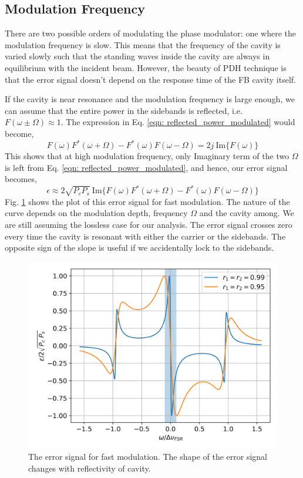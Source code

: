 \documentclass{Resources/cquicc}
\begin{document}
\subsection{Modulation Frequency}
There are two possible orders of modulating the phase modulator: one where the modulation frequency is slow. This means that the frequency of the cavity is varied slowly such that the standing waves inside the cavity are always in equilibrium with the incident beam. However, the beauty of PDH technique is that the error signal doesn't depend on the response time of the FB cavity itself. \par
If the cavity is near resonance and the modulation frequency is large enough, we can assume that the entire power in the sidebands is reflected, i.e. $F(\omega \pm \Omega) \approx 1$. The expression in Eq. \ref{eqn: reflected_power_modulated} would become, 
\begin{equation}
  F(\omega) F^*(\omega+\Omega) - F^*(\omega) F(\omega-\Omega) = 2 j~\mathrm{Im}\{F(\omega)\}
\end{equation}
This shows that at high modulation frequency, only Imaginary term of the two $\Omega$ is left from Eq. \ref{eqn: reflected_power_modulated}, and hence, our error signal becomes, 
\begin{equation}
    \epsilon \approx 2\sqrt{P_cP_s}~\mathrm{Im}\{F(\omega) F^*(\omega+\Omega)- F^*(\omega) F(\omega-\Omega) \}
\end{equation}
Fig. \ref{fig: pdh-error-signal} shows the plot of this error signal for fast modulation. The nature of the curve depends on the modulation depth, frequency $\Omega$ and the cavity among. We are still assuming the lossless case for our analysis. The error signal crosses zero every time the cavity is resonant with either the carrier or the sidebands. The opposite sign of the slope is useful if we accidentally lock to the sidebands. \par
\begin{figure}[h]
    \centering
    \includegraphics[width=\linewidth]{images/error_signal_depth_95.png}
    \caption{The error signal for fast modulation. The shape of the error signal changes with reflectivity of cavity.}
    \label{fig: pdh-error-signal}
\end{figure}
\end{document}
